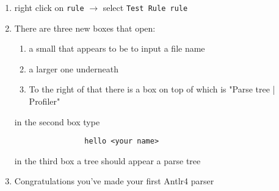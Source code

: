 \documentclass[../setup.tex]{subfiles}
\begin{document}
\begin{enumerate}
			\item right click on \texttt{rule} $\rightarrow$ select \texttt{Test Rule rule}

			\item There are three new boxes that open:
			\begin{enumerate}
				\item a small that appears to be to input a file name
				\item a larger one underneath
				\item To the right of that there is a box on top of which is "Parse tree | Profiler"
			\end{enumerate}
			in the second box type
			\begin{lstlisting}
				hello <your name>
			\end{lstlisting}
			in the third box a tree should appear a parse tree

			\item Congratulations you've made your first Antlr4 parser

		\end{enumerate}
\end{document}
